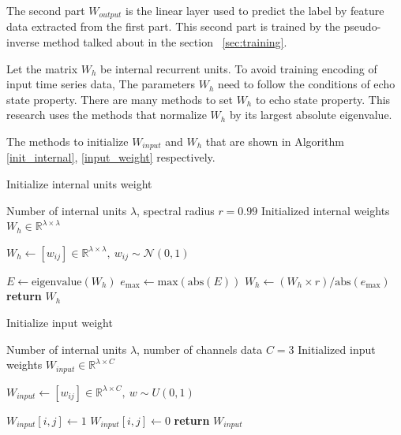 The second part $W_{output}$ is the linear layer used to predict the label by feature data extracted from the first part\cite{cucchi2022hands, bianchi2020reservoir}. This second part is trained by the pseudo-inverse method talked about in the section ~\ref{sec:training}.

Let the matrix $W_h$ be internal recurrent units. To avoid training encoding of input time series data, The parameters $W_h$ need to follow the conditions of echo state property. There are many methods to set $W_h$ to echo state property. This research uses the methods that normalize $W_h$ by its largest absolute eigenvalue. 

The methods to initialize $W_{input}$ and $W_h$ that are shown in Algorithm \ref{init_internal}, \ref{input_weight} respectively\cite{bianchi2020reservoir, jaeger2002adaptive}. 

\begin{algorithm}
    \caption{Initialize internal units weight}
    \label{init_internal}
    \begin{algorithmic}[1]
        \renewcommand{\algorithmicrequire}{\textbf{Input:}}
        \renewcommand{\algorithmicensure}{\textbf{Output:}}
        \Require  Number of internal units $\lambda$, spectral radius $r=0.99$
    \Ensure Initialized internal weights $W_h\in\mathbb{R}^{\lambda\times\lambda}$

    \State $W_h \gets [w_{ij}]\in\mathbb{R}^{\lambda\times\lambda},\  w_{ij}\sim \mathcal{N}(0, 1)$
     
    \State $E \gets \text{eigenvalue}(W_h)$
    \State $e_{\text{max}} \gets \text{max}(\text{abs}(E))$
    \State $W_h \gets (W_h\times r) / \text{abs}(e_{\text{max}})$
    \State \textbf{return} $W_h$
    \end{algorithmic}
\end{algorithm}

\begin{algorithm}
    \caption{Initialize input weight}
    \label{input_weight}
    \begin{algorithmic}[1]
        \renewcommand{\algorithmicrequire}{\textbf{Input:}}
        \renewcommand{\algorithmicensure}{\textbf{Output:}}
        \Require Number of internal units $\lambda$, number of channels data $C = 3$
    \Ensure Initialized input weights $W_{input} \in\mathbb{R}^{\lambda\times C}$

    \State $W_{input} \gets [w_{ij}]\in\mathbb{R}^{\lambda\times C},\ w\sim U(0, 1)$
     
                \State $W_{input}[i, j]\gets 1$
            \Else
                \State $W_{input}[i, j]\gets 0$
            \EndIf
        \EndFor
    \EndFor
    \State \textbf{return} $W_{input}$
    \end{algorithmic}
\end{algorithm}

